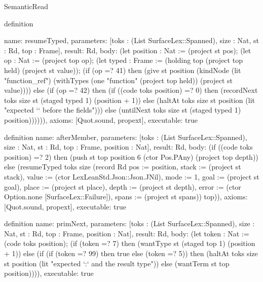 \begin{lexlean}{SemanticRead}
\begin{semanticmodule}
definition{
  name: resumeTyped,
  parameters: [toks : (List SurfaceLex::Spanned), size : Nat, st : Rd, top : Frame],
  result: Rd,
  body: (let position : Nat := (project st pos); (let op : Nat := (project top op); (let typed : Frame := (holding top (project top held) (project st value)); (if (op =? 41) then (give st position (kindNode (lit "function_ref") (withTypes (one "function" (project top held)) (project st value)))) else (if (op =? 42) then (if ((code toks position) =? 0) then (recordNext toks size st (staged typed 1) (position + 1)) else (haltAt toks size st position (lit "expected `{` before the fields"))) else (untilNext toks size st (staged typed 1) position)))))),
  axioms: [Quot.sound, propext],
  executable: true
}

definition{
  name: afterMember,
  parameters: [toks : (List SurfaceLex::Spanned), size : Nat, st : Rd, top : Frame, position : Nat],
  result: Rd,
  body: (if ((code toks position) =? 2) then (push st top position 6 (ctor Pos.PAny) (project top depth)) else (resumeTyped toks size (record Rd {pos := position, stack := (project st stack), value := (ctor LexLeanStd.Json::Json.JNil), mode := 1, goal := (project st goal), place := (project st place), depth := (project st depth), error := (ctor Option.none [SurfaceLex::Failure]), spans := (project st spans)}) top)),
  axioms: [Quot.sound, propext],
  executable: true
}

definition{
  name: primNext,
  parameters: [toks : (List SurfaceLex::Spanned), size : Nat, st : Rd, top : Frame, position : Nat],
  result: Rd,
  body: (let token : Nat := (code toks position); (if (token =? 7) then (wantType st (staged top 1) (position + 1)) else (if (if (token =? 99) then true else (token =? 5)) then (haltAt toks size st position (lit "expected `:` and the result type")) else (wantTerm st top position)))),
  executable: true
}

}
\end{semanticmodule}
\end{lexlean}
